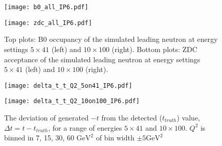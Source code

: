 \begin{figure}
  \centering
  \begin{minipage}[b]{0.48\linewidth}
    \texttt{[image: b0\_all\_IP6.pdf]}
  \end{minipage}
  \begin{minipage}[b]{0.48\linewidth}
    \texttt{[image: zdc\_all\_IP6.pdf]}
  \end{minipage}
  
  \caption{Top plots: B0 occupancy of the simulated leading neutron at energy settings $5\times41$ (left) and $10\times100$ (right). Bottom plots: ZDC acceptance of the simulated leading neutron at energy settings $5\times41$ (left) and $10\times100$ (right).}
  \label{fig:b0_zdc_all}
\end{figure}


\begin{figure}
  \centering
  \begin{minipage}[b]{0.48\linewidth}
    \texttt{[image: delta\_t\_t\_Q2\_5on41\_IP6.pdf]}
  \end{minipage}  
  \begin{minipage}[b]{0.48\linewidth}
    \texttt{[image: delta\_t\_t\_Q2\_10on100\_IP6.pdf]}
  \end{minipage}
  
  \caption{The deviation of generated $-t$ from the detected ($t_{truth}$) value, $\Delta{t}=t-t_{truth}$, for a range of energies $5\times41$ and $10\times100$. $Q^2$ is binned in 7, 15, 30, 60 $\mathrm{GeV}^2$ of bin width $\pm5\mathrm{GeV}^2$}
  \label{fig:delta_t_t_Q2_IP6}
\end{figure}
